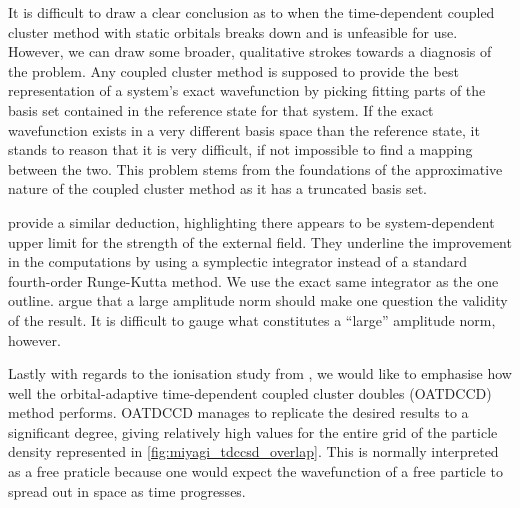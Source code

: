 It is difficult to draw a clear conclusion as to when the time-dependent coupled cluster 
method with static orbitals breaks down and is unfeasible for use. However, we can 
draw some broader, qualitative strokes towards a diagnosis of the problem. Any coupled 
cluster method is supposed to provide the best representation of a system's exact 
wavefunction by picking fitting parts of the basis set contained in the reference 
state for that system. If the exact wavefunction exists in a very different basis 
space than the reference state, it stands to reason that it is very difficult, if 
not impossible to find a mapping between the two. This problem stems from the foundations 
of the approximative nature of the coupled cluster method as it has a truncated basis set. 

\citeauthor{pedersen2019symplectic}\cite{pedersen2019symplectic} provide a similar 
deduction, highlighting there appears to be system-dependent upper limit for 
the strength of the external field. They underline the improvement in the computations 
by using a symplectic integrator instead of a standard fourth-order Runge-Kutta method.
We use the exact same integrator as the one \citeauthor{pedersen2019symplectic} outline.
\citeauthor{pedersen2019symplectic} argue that a large amplitude norm should make one 
question the validity of the result. It is difficult to gauge what constitutes a ``large''
amplitude norm, however.

Lastly with regards to the ionisation study from \citeauthor{miyagi2013time}\cite{miyagi2013time},
we would like to emphasise how well the orbital-adaptive time-dependent coupled cluster 
doubles (OATDCCD) method performs. OATDCCD manages to replicate the desired results 
to a significant degree, giving relatively high values for the entire grid 
of the particle density represented in \autoref{fig:miyagi_tdccsd_overlap}. This is 
normally interpreted as a free praticle because one would expect the wavefunction of 
a free particle to spread out in space as time progresses.